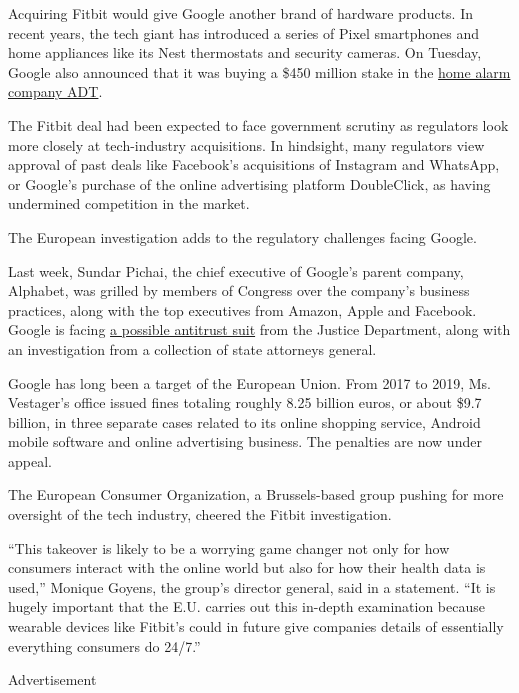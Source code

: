 Acquiring Fitbit would give Google another brand of hardware products.
In recent years, the tech giant has introduced a series of Pixel
smartphones and home appliances like its Nest thermostats and security
cameras. On Tuesday, Google also announced that it was buying a \$450
million stake in the
\href{https://www.globenewswire.com/news-release/2020/08/03/2071540/0/en/ADT-and-Google-Partner-To-Create-Leading-Smart-Home-Security-Offering.html}{home
alarm company ADT}.

The Fitbit deal had been expected to face government scrutiny as
regulators look more closely at tech-industry acquisitions. In
hindsight, many regulators view approval of past deals like Facebook's
acquisitions of Instagram and WhatsApp, or Google's purchase of the
online advertising platform DoubleClick, as having undermined
competition in the market.

The European investigation adds to the regulatory challenges facing
Google.

Last week, Sundar Pichai, the chief executive of Google's parent
company, Alphabet, was grilled by members of Congress over the company's
business practices, along with the top executives from Amazon, Apple and
Facebook. Google is facing
\href{https://www.nytimes3xbfgragh.onion/2020/06/25/technology/barr-google-investigation.html}{a
possible antitrust suit} from the Justice Department, along with an
investigation from a collection of state attorneys general.

Google has long been a target of the European Union. From 2017 to 2019,
Ms. Vestager's office issued fines totaling roughly 8.25 billion euros,
or about \$9.7 billion, in three separate cases related to its online
shopping service, Android mobile software and online advertising
business. The penalties are now under appeal.

The European Consumer Organization, a Brussels-based group pushing for
more oversight of the tech industry, cheered the Fitbit investigation.

``This takeover is likely to be a worrying game changer not only for how
consumers interact with the online world but also for how their health
data is used,'' Monique Goyens, the group's director general, said in a
statement. ``It is hugely important that the E.U. carries out this
in-depth examination because wearable devices like Fitbit's could in
future give companies details of essentially everything consumers do
24/7.''

Advertisement

